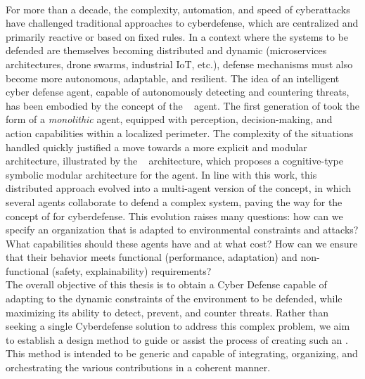 \clearpage
\thispagestyle{empty}
\null
\newpage
\cleardoublepage
{}
\cleardoublepage
{}
\
\vspace{1em}
\bigskip
{}\\
\noindent
For more than a decade, the complexity, automation, and speed of cyberattacks have challenged traditional approaches to cyberdefense, which are centralized and primarily reactive or based on fixed rules. In a context where the systems to be defended are themselves becoming distributed and dynamic (microservices architectures, drone swarms, industrial IoT, etc.), defense mechanisms must also become more autonomous, adaptable, and resilient.
The idea of an intelligent cyber defense agent, capable of autonomously detecting and countering threats, has been embodied by the concept of the ~\cite{Kott2023} agent. The first generation of \acn{AICA} took the form of a \textit{monolithic} agent, equipped with perception, decision-making, and action capabilities within a localized perimeter. The complexity of the situations handled quickly justified a move towards a more explicit and modular architecture, illustrated by the ~\cite{Kott2023} architecture, which proposes a cognitive-type symbolic modular architecture for the  agent.
In line with this work, this distributed approach evolved into a multi-agent version of the \acn{AICA} concept, in which several agents collaborate to defend a complex system, paving the way for the concept of \acn{SMA} for cyberdefense. This evolution raises many questions: how can we specify an organization that is adapted to environmental constraints and attacks? What capabilities should these agents have and at what cost? How can we ensure that their behavior meets functional (performance, adaptation) and non-functional (safety, explainability) requirements?
\
\bigskip
{}\\
\noindent
The overall objective of this thesis is to obtain a Cyber Defense  capable of adapting to the dynamic constraints of the environment to be defended, while maximizing its ability to detect, prevent, and counter threats.
%
Rather than seeking a single Cyberdefense \acn{SMA} solution to address this complex problem, we aim to establish a design method to guide or assist the process of creating such an \acn{SMA}. This method is intended to be generic and capable of integrating, organizing, and orchestrating the various contributions in a coherent manner.
